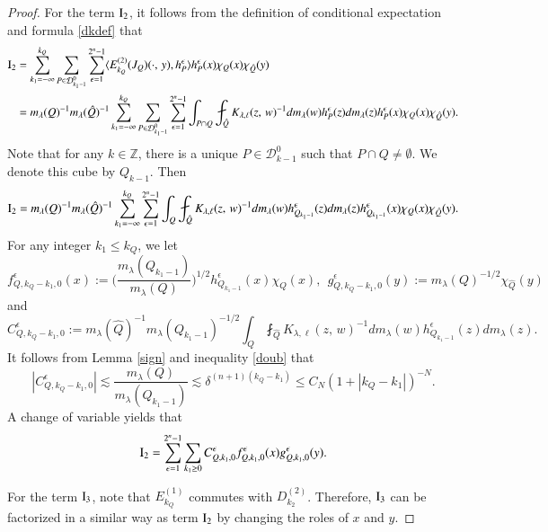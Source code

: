 \documentclass[12pt]{amsart}
\begin{document}
\begin{proof}
For the term ${\rm I}_2$, it follows from the definition of conditional expectation and formula \eqref{dkdef} that
\begin{align*}
{\rm I}_2&=\sum_{k_1=-\infty}^{k_Q}\sum_{P\in\mathcal{D}^0_{k_1-1}}\sum_{\epsilon=1}^{2^n-1}\langle E_{k_Q}^{(2)}(J_Q)(\cdot,\,y), h_P^\epsilon\rangle h_P^\epsilon(x)\chi_Q(x)\chi_{\hat{Q}}(y)\\
&=m_\lambda(Q)^{-1}m_\lambda(\hat{Q})^{-1}\sum_{k_1=-\infty}^{k_Q}\sum_{P\in\mathcal{D}^0_{k_1-1}}\sum_{\epsilon=1}^{2^n-1}\int_{P\cap Q}\fint_{\hat{Q}} K_{\lambda,\ell}(z,\,w)^{-1}dm_\lambda(w)h_P^\epsilon(z)dm_\lambda(z)h_P^\epsilon(x)\chi_Q(x)\chi_{\hat{Q}}(y).
\end{align*}
Note that for any $k\in\mathbb{Z}$, there is a unique $P\in\mathcal{D}^0_{k-1}$ such that $P\cap Q\neq\emptyset$. We denote this cube by $Q_{k-1}$. Then
\begin{align*}
{\rm I_2}=m_\lambda(Q)^{-1}m_\lambda(\hat{Q})^{-1}\sum_{k_1=-\infty}^{k_Q}\sum_{\epsilon=1}^{2^n-1}\int_{ Q}\fint_{\hat{Q}} K_{\lambda,\ell}(z,\,w)^{-1}dm_\lambda(w)h_{Q_{k_1-1}}^\epsilon(z)dm_\lambda(z)h_{Q_{k_1-1}}^\epsilon(x)\chi_Q(x)\chi_{\hat{Q}}(y).
\end{align*}
For any integer $k_1\leq k_Q $, we let $$f_{Q,k_Q-k_1,0}^{\epsilon}(x):=\Big(\frac{m_{\lambda}(Q_{k_1-1})}{m_\lambda(Q)}\Big)^{1/2}h_{Q_{k_1-1}}^\epsilon(x)\chi_Q(x),\ \  g_{Q,k_Q-k_1,0}^{\epsilon}(y):=m_\lambda(Q)^{-1/2}\chi_{\hat{Q}}(y)$$ and $$C_{Q,k_Q-k_1,0}^{\epsilon}:=m_\lambda(\hat{Q})^{-1}m_{\lambda}(Q_{k_1-1})^{-1/2}\int_{ Q}\fint_{\hat{Q}} K_{\lambda,\ell}(z,\,w)^{-1}dm_\lambda(w)h_{Q_{k_1-1}}^\epsilon(z)dm_\lambda(z).$$
It follows from Lemma \ref{sign} and inequality \eqref{doub} that
$$
|C_{Q,k_Q-k_1,0}^{\epsilon}|\lesssim \frac{m_\lambda(Q)}{m_\lambda(Q_{k_1-1})}\lesssim \delta^{(n+1)(k_Q-k_1)}\leq C_N (1+|k_Q-k_1|)^{-N}.
$$
A change of variable yields that $${\rm I}_2=\sum_{\epsilon=1}^{2^n-1}\sum_{k_1\geq 0}C_{Q,k_1,0}^{\epsilon} f_{Q,k_1,0}^{\epsilon}(x)g_{Q,k_1,0}^{\epsilon}(y).$$

For the term ${\rm I}_3$, note that $E_{k_Q}^{(1)}$ commutes with $D_{k_2}^{(2)}$. Therefore, ${\rm I}_3$ can be factorized in a similar way as term ${\rm I}_2$ by changing the roles of $x$ and $y$.



\end{proof}
\end{document}
